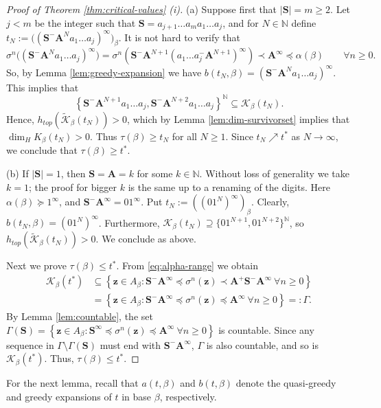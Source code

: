 \documentclass[12pt]{amsart}
\theoremstyle{definition}
\theoremstyle{remark}
\numberwithin{equation}{section}
\newcommand{\N}{\ensuremath{\mathbb{N}}}
\newcommand{\cs}{ {\mathbf{S}}}
\newcommand{\ca}{ {\mathbf{A}}}
\newcommand{\z}{\mathbf{z}}
\newcommand{\set}[1]{\left\{#1\right\}}
\newcommand{\Ga}{\Gamma}
\newcommand{\f}{\infty}
\newcommand{\de}{\delta}
\newcommand{\al}{\alpha}
\newcommand{\lle}{\preccurlyeq}
\newcommand{\lge}{\succcurlyeq}
\newcommand{\si}{\sigma}
\newcommand{\K}{\mathcal K}
\begin{document}
{\begin{proof}[Proof of Theorem \ref{thm:critical-values} (i)]
(a) Suppose first that $|\cs|=m\geq 2$. Let $j<m$ be the integer such that $\cs=a_{j+1}\ldots a_m a_1\ldots a_j$, and for $N\in\N$ define $t_N:= \big((\cs^-\ca^N a_1\ldots a_j)^\f\big)_\beta$. It is not hard to verify that
\begin{equation*}
\si^n\big((\cs^-\ca^N a_1\ldots a_j)^\f\big)=\si^n\left(\cs^-\ca^{N+1}(a_1\ldots a_j^-\ca^{N+1})^\f\right)
\prec \ca^\f\lle\al(\beta)\qquad \forall n\ge 0.
\end{equation*}
So, by Lemma \ref{lem:greedy-expansion} we have $b(t_N, \beta)=(\cs^-\ca^N a_1\ldots a_j)^\f$. This implies that %
\[
\set{\cs^-\ca^{N+1}a_1\ldots a_j, \cs^- \ca^{N+2}a_1\ldots a_j}^\N\subseteq\K_\beta(t_N).
\]
Hence, $h_{top}(\widetilde{\K}_\beta(t_N))>0$, which by Lemma \ref{lem:dim-survivorset} implies that $\dim_H K_\beta(t_N)>0$. Thus $\tau(\beta)\ge t_N$ for all $N\ge 1$. Since $t_N\nearrow t^*$ as $N\to\f$, we conclude that $\tau(\beta)\ge t^*$.

(b) If $|\cs|=1$, then $\cs=\ca=k$ for some $k\in\N$. Without loss of generality we take $k=1$; the proof for bigger $k$ is the same up to a renaming of the digits. Here $\al(\beta)\lge 1^\f$, and $\cs^-\ca^\f=01^\f$. Put $t_N:=((01^N)^\f)_\beta$. Clearly, $b(t_N,\beta)=(01^N)^\f$. Furthermore, $\K_\beta(t_N)\supseteq\{01^{N+1},01^{N+2}\}^\N$, so $h_{top}(\widetilde{\K}_\beta(t_N))>0$. We conclude as above.

Next we prove $\tau(\beta)\le t^*$. From \eqref{eq:alpha-range} we obtain
\begin{align*}
\K_\beta(t^*)&\subseteq\set{\z\in A_\beta: \cs^-\ca^\f\lle \si^n(\z)\prec \ca^+\cs^-\ca^\f~\forall n\ge 0}\\
&=\set{\z\in A_\beta: \cs^-\ca^\f\lle \si^n(\z)\lle \ca^\f~\forall n\ge 0}=:\Ga.
\end{align*}
By Lemma \ref{lem:countable}, the set $\Ga(\cs)=\set{\z\in A_\beta: \cs^\f\lle\si^n(\z)\lle \ca^\f~\forall n\ge 0}$ is countable. Since any sequence in $\Ga\setminus\Ga(\cs)$ must end with $\cs^-\ca^\f$, $\Ga$ is also countable, and so is $\K_\beta(t^*)$. Thus, $\tau(\beta)\le t^*$.
\end{proof}

For the next lemma, recall that $a(t,\beta)$ and $b(t,\beta)$ denote the quasi-greedy and greedy expansions of $t$ in base $\beta$, respectively.

}
\end{document}
